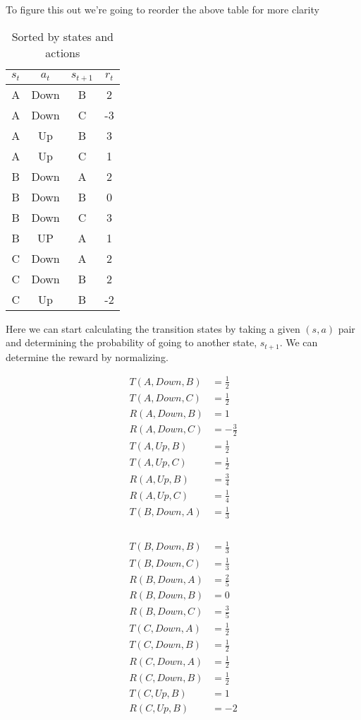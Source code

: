\documentclass[12pt,letter]{article}
\begin{document}
To figure this out we're going to reorder the above table for more clarity
\begin{table}[h]
\centering
\begin{tabular}{|c|c|c|c|}
    \hline
    $s_t$ & $a_t$ & $s_{t+1}$ & $r_t$\\
    \hline
    A & Down & B & 2\\\hline
    A & Down & C & -3\\\hline
    A & Up   & B & 3\\\hline
    A & Up   & C & 1\\\hline
    B & Down & A & 2\\\hline
    B & Down & B & 0\\\hline
    B & Down & C & 3\\\hline
    B & UP   & A & 1\\\hline
    C & Down & A & 2\\\hline
    C & Down & B & 2\\\hline
    C & Up   & B & -2\\\hline
\end{tabular}
\caption{Sorted by states and actions}
\end{table}
Here we can start calculating the transition states by taking a given $(s,a)$
pair and determining the probability of going to another state, $s_{t+1}$. We
can determine the reward by normalizing.
\\
\begin{minipage}{\textwidth}
\begin{multicols}{2}
\begin{align*}
    T(A,Down,B) &= \frac12\\
    T(A,Down,C) &= \frac12\\
    R(A,Down,B) &= 1\\
    R(A,Down,C) &= -\frac32\\
    T(A,Up,B)   &= \frac12\\
    T(A,Up,C)   &= \frac12\\
    R(A,Up,B)   &= \frac34\\
    R(A,Up,C)   &= \frac14\\
    T(B,Down,A) &= \frac13\\
\end{align*}
\\
\begin{align*}
    T(B,Down,B) &= \frac13\\
    T(B,Down,C) &= \frac13\\
    R(B,Down,A) &= \frac25\\
    R(B,Down,B) &= 0\\
    R(B,Down,C) &= \frac35\\
    T(C,Down,A) &= \frac12\\
    T(C,Down,B) &= \frac12\\
    R(C,Down,A) &= \frac12\\
    R(C,Down,B) &= \frac12\\
    T(C,Up,B)   &= 1\\
    R(C,Up,B)   &= -2\\
\end{align*}
\end{multicols}
\end{minipage}
\end{document}
